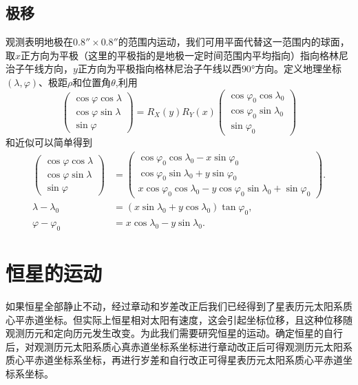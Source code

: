 \documentclass[11pt, a4paper, oneside]{ctexart}
\numberwithin{equation}{subsection}
\begin{document}
\subsection{极移}
观测表明地极在$\ang{;;0.8}\times\ang{;;0.8}$的范围内运动，我们可用平面代替这一范围内的球面，取$x$正方向为平极（这里的平极指的是地极一定时间范围内平均指向）指向格林尼治子午线方向，$y$正方向为平极指向格林尼治子午线以西$\ang{90;;}$方向。定义地理坐标$\left(\lambda,\varphi\right)$、极距$\rho$和位置角$\theta$,利用
\begin{equation}
\begin{pmatrix}
\cos\varphi\cos\lambda\\
\cos\varphi\sin\lambda\\
\sin\varphi
\end{pmatrix}=R_X\left(y\right)R_Y\left(x\right)
\begin{pmatrix}
\cos\varphi_0\cos\lambda_0\\
\cos\varphi_0\sin\lambda_0\\
\sin\varphi_0
\end{pmatrix}
\end{equation}
和近似可以简单得到
\begin{align}
\begin{pmatrix}
\cos\varphi\cos\lambda\\
\cos\varphi\sin\lambda\\
\sin\varphi
\end{pmatrix}&=
\begin{pmatrix}
\cos\varphi_0\cos\lambda_0-x\sin\varphi_0\\
\cos\varphi_0\sin\lambda_0+y\sin\varphi_0\\
x\cos\varphi_0\cos\lambda_0-y\cos\varphi_0\sin\lambda_0+\sin\varphi_0
\end{pmatrix}.\\
\lambda-\lambda_{0}&=\left(x\sin\lambda_{0}+y\cos\lambda_{0}\right)\tan\varphi_{0},\\
\varphi-\varphi_{0}&=x\cos\lambda_{0}-y\sin\lambda_{0}.
\end{align}

\newpage
\section{恒星的运动}
如果恒星全部静止不动，经过章动和岁差改正后我们已经得到了星表历元太阳系质心平赤道坐标。但实际上恒星相对太阳有速度，这会引起坐标位移，且这种位移随观测历元和定向历元发生改变。为此我们需要研究恒星的运动。确定恒星的自行后，对观测历元太阳系质心真赤道坐标系坐标进行章动改正后可得观测历元太阳系质心平赤道坐标系坐标，再进行岁差和自行改正可得星表历元太阳系质心平赤道坐标系坐标。
\end{document}
